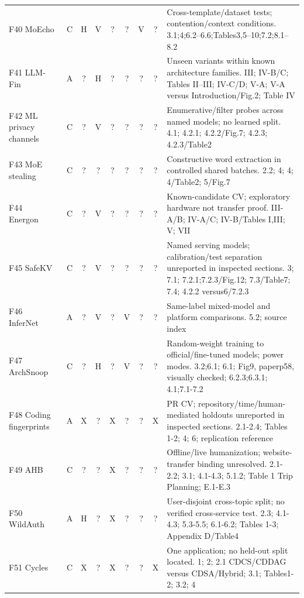 \begin{table}[p]
\begin{tabularx}{\textwidth}{@{}p{}cccccccY@{}}
F40 MoEcho~\cite{ding2025moecho} & C & H & V & ? & ? & V & ? & Cross-template/dataset tests; contention/context conditions. 3.1;4;6.2--6.6;Tables3,5--10;7.2;8.1--8.2\\
F41 LLM-Fin~\cite{nazari2024llmfin} & A & ? & H & ? & ? & ? & ? & Unseen variants within known architecture families. III; IV-B/C; Tables II--III; IV-C/D; V-A; V-A versus Introduction/Fig.2; Table IV\\
F42 ML privacy channels~\cite{debenedetti2024privacy} & C & ? & V & ? & ? & ? & ? & Enumerative/filter probes across named models; no learned split. 4.1; 4.2.1; 4.2.2/Fig.7; 4.2.3; 4.2.3/Table2\\
F43 MoE stealing~\cite{yona2024stealing} & C & ? & ? & ? & ? & ? & ? & Constructive word extraction in controlled shared batches. 2.2; 4; 4; 4/Table2; 5/Fig.7\\
F44 Energon~\cite{chaudhuri2025energon} & C & ? & V & ? & ? & ? & ? & Known-candidate CV; exploratory hardware not transfer proof. III-A/B; IV-A/C; IV-B/Tables I,III; V; VII\\
F45 SafeKV~\cite{chu2025safekv} & C & ? & V & ? & ? & ? & ? & Named serving models; calibration/test separation unreported in inspected sections. 3; 7.1; 7.2.1;7.2.3/Fig.12; 7.3/Table7; 7.4; 4.2.2 versus6/7.2.3\\
F46 InferNet~\cite{anwar2026infernet} & A & ? & V & ? & V & ? & ? & Same-label mixed-model and platform comparisons. 5.2; source index\\
F47 ArchSnoop~\cite{weng2026archsnoop} & C & ? & H & ? & V & ? & ? & Random-weight training to official/fine-tuned models; power modes. 3.2;6.1; 6.1; Fig9, paperp58, visually checked; 6.2.3;6.3.1; 4.1;7.1-7.2\\
F48 Coding fingerprints~\cite{ghaleb2026codingfingerprint} & A & X & ? & X & ? & ? & X & PR CV; repository/time/human-mediated holdouts unreported in inspected sections. 2.1-2.4; Tables 1-2; 4; 6; replication reference\\
F49 AHB~\cite{zhu2026turing} & C & ? & ? & X & ? & ? & ? & Offline/live humanization; website-transfer binding unresolved. 2.1-2.2; 3.1; 4.1-4.3; 5.1.2; Table 1 Trip Planning; E.1-E.3\\
F50 WildAuth~\cite{wang2026dialogue} & A & H & ? & X & ? & ? & ? & User-disjoint cross-topic split; no verified cross-service test. 2.3; 4.1-4.3; 5.3-5.5; 6.1-6.2; Tables 1-3; Appendix D/Table4\\
F51 Cycles~\cite{george2025cycles} & C & X & ? & X & ? & ? & X & One application; no held-out split located. 1; 2; 2.1 CDCS/CDDAG versus CDSA/Hybrid; 3.1; Tables1-2; 3.2; 4\\

\end{tabularx}
\end{table}
